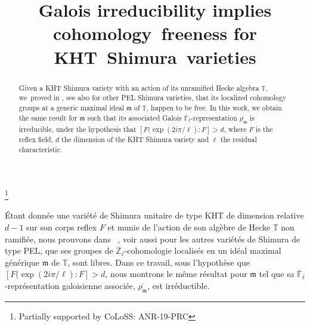 \documentclass[JEP,XML,SOM,Unicode,published]{cedram}
\theoremstyle{plain}
\theoremstyle{definition}
\numberwithin{equation}{subsection}
\begin{document}
\frontmatter

\title[Galois irreducibility implies cohomology freeness]{Galois irreducibility implies cohomology~freeness for KHT~Shimura~varieties}

\author[\initial{P.} \lastname{Boyer}]{ }
\address{Université Sorbonne Paris Nord, LAGA, CNRS, UMR 7539\\
99 avenue J.-B. Clément, F-93430 Villetaneuse, France}


\thanks{Partially supported by CoLoSS: ANR-19-PRC}

\begin{abstract}
Given a KHT Shimura variety with an action of its unramified Hecke algebra $\mathbb{T}$, we~proved in \cite{boyer-imj}, see also \cite{scholze-cara} for other PEL Shimura varieties, that its localized cohomology groups at a generic maximal ideal $\mathfrak m$ of $\mathbb{T}$, happen to be free. In this work, we obtain the same result for $\mathfrak m$ such that its associated Galois $\overline {\mathbb F}_\ell$-representation $\overline{\rho_{\mathfrak m}}$ is irreducible, under the hypothesis that $[F(\exp(2i\pi/\ell):F]>d$, where $F$ is the reflex field, $d$ the dimension of the KHT Shimura variety and $\ell$ the residual characteristic.
\end{abstract}





\begin{altabstract}
Étant donnée une variété de Shimura unitaire de type KHT de dimension relative $d-1$ sur son corps reflex $F$ et munie de l'action de son algèbre de Hecke $\mathbb{T}$ non ramifiée, nous prouvons dans ~\cite{boyer-imj}, voir aussi \cite{scholze-cara} pour les autres variétés de Shimura de type PEL, que ses groupes de $\overline{\mathbb{Z}}_\ell$-cohomologie localisés en un idéal maximal générique $\mathfrak m$ de $\mathbb{T}$, sont libres. Dans ce travail,  sous l'hypothèse que $[F(\exp(2i\pi/\ell):F]>d$, nous montrons le même résultat pour $\mathfrak m$ tel que sa  $\overline{\mathbb{F}}_\ell$-représentation galoisienne associée, $\overline{\rho_{\mathfrak m}}$, est irréductible.
\end{altabstract}
\end{document}
